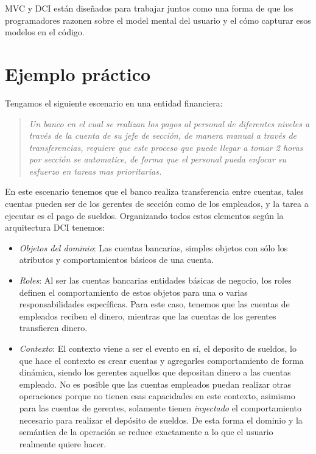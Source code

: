   MVC y DCI est\'an dise\~nados para trabajar juntos como una forma
  de que los programadores razonen sobre el model mental del usuario y
  el c\'omo capturar esos modelos en el c\'odigo.

\section{Ejemplo pr\'actico}
  Tengamos el siguiente escenario en una entidad financiera:
  \begin{quote}

    \emph{Un banco en el cual se realizan los pagos al personal de
    diferentes niveles a trav\'es de la cuenta de su jefe de
    secci\'on, de manera manual a trav\'es de transferencias, requiere
    que este proceso que puede llegar a tomar 2 horas por secci\'on se
    automatice, de forma que el personal pueda enfocar su esfuerzo en
    tareas mas prioritarias.}
  \end{quote}

  En este escenario tenemos que el banco realiza transferencia entre
  cuentas, tales cuentas pueden ser de los gerentes de secci\'on como
  de los empleados, y la tarea a ejecutar es el pago de
  sueldos. Organizando todos estos elementos seg\'un la arquitectura
  DCI tenemos:

  \begin{itemize}
    \item \emph{Objetos del dominio}: Las cuentas bancarias, simples
      objetos con s\'olo los atributos y comportamientos b\'asicos de
      una cuenta.

    \item \emph{Roles}: Al ser las cuentas bancarias entidades
      b\'asicas de negocio, los roles definen el comportamiento de
      estos objetos para una o varias responsabilidades
      espec\'ificas. Para este caso, tenemos que las cuentas de
      empleados reciben el dinero, mientras que las cuentas de los
      gerentes transfieren dinero.

    \item \emph{Contexto}: El contexto viene a ser el evento en s\'i,
      el deposito de sueldos, lo que hace el contexto es crear cuentas
      y agregarles comportamiento de forma din\'amica, siendo los
      gerentes aquellos que depositan dinero a las cuentas
      empleado. No es posible que las cuentas empleados puedan
      realizar otras operaciones porque no tienen esas capacidades en
      este contexto, asimismo para las cuentas de gerentes, solamente
      tienen \emph{inyectado} el comportamiento necesario para
      realizar el dep\'osito de sueldos. De esta forma el dominio y la
      sem\'antica de la operaci\'on se reduce exactamente a lo que el
      usuario realmente quiere hacer.

  \end{itemize}

